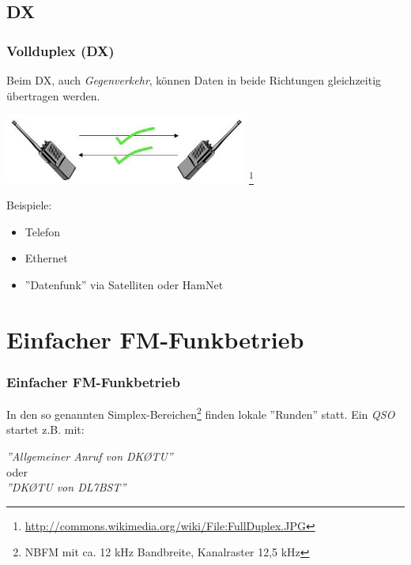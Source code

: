 \subsection{DX}

\begin{frame}
    \frametitle{Vollduplex (DX)}

    Beim DX, auch \emph{Gegenverkehr}, können Daten in beide Richtungen
    gleichzeitig übertragen werden. \\[1em]

    \begin{center}
        \includegraphics[width=0.6\textwidth]{bv11/FullDuplex.jpg}
        \footnote{\tiny \url{http://commons.wikimedia.org/wiki/File:FullDuplex.JPG}}
    \end{center}

    Beispiele:

    \begin{itemize}
        \item Telefon
        \item Ethernet
        \item ''Datenfunk'' via Satelliten oder HamNet
    \end{itemize}

\end{frame}

\section[FM-Funkbetrieb]{Einfacher FM-Funkbetrieb}

\begin{frame}
    \frametitle{Einfacher FM-Funkbetrieb}

    In den so genannten Simplex-Bereichen\footnote{NBFM mit ca. 12 kHz
    Bandbreite, Kanalraster 12,5 kHz} finden lokale ''Runden'' statt.
    Ein \emph{QSO} startet z.B. mit: \\[2em]

    \begin{center}
        \Large \emph{''Allgemeiner Anruf von DKØTU''} \\[1em]
        \normalsize oder \\[1em]
        \Large \emph{''DKØTU von DL7BST''}
    \end{center}

\end{frame}

